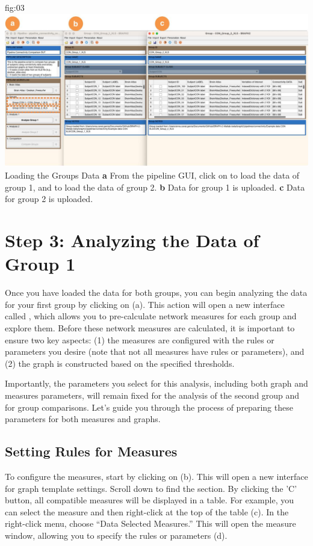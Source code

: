 \documentclass[justified]{tufte-handout}
\begin{document}
	{fig:03}
	{
	\includegraphics{fig03.jpg}
	}
	{Loading the Groups Data}
	{
	{\bf a} From the pipeline GUI, click on  to load the data of group 1, and  to load the data of group 2.
	{\bf b} Data for group 1 is uploaded. {\bf c} Data for group 2 is uploaded.
	}

\section{Step 3: Analyzing the Data of Group 1}

Once you have loaded the data for both groups, you can begin analyzing the data for your first group by clicking on  (a). 
This action will open a new interface called , which allows you to pre-calculate network measures for each group and explore them. 
Before these network measures are calculated, it is important to ensure two key aspects: (1) the measures are configured with the rules or parameters you desire (note that not all measures have rules or parameters), and (2) the graph is constructed based on the specified thresholds.

Importantly, the parameters you select for this analysis, including both graph and measures parameters, will remain fixed for the analysis of the second group and for group comparisons. Let's guide you through the process of preparing these parameters for both measures and graphs.

\subsection{Setting Rules for Measures}

To configure the measures, start by clicking on  (b). This will open a new interface for graph template settings. 
Scroll down to find the  section. 
By clicking the 'C' button, all compatible measures will be displayed in a table. 
For example, you can select the  measure and then right-click at the top of the table (c). 
In the right-click menu, choose “Data Selected Measures.” 
This will open the measure window, allowing you to specify the rules or parameters (d).
\end{document}

